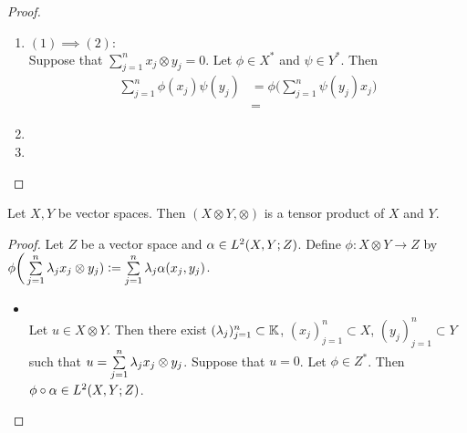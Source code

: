 \documentclass{book}
\begin{document}
 \begin{proof}\
 	\begin{enumerate}
 		\item $(1) \implies (2):$ \\
 		Suppose that $\sum\limits_{j=1}^n x_j \otimes y_j = 0$. Let $\phi \in X^*$ and $\psi \in Y^*$. Then 
 		\begin{align*}
 			\sum\limits_{j=1}^n  \phi(x_j) \psi(y_j)
 			& = \phi \bigg( \sum\limits_{j=1}^n \psi(y_j) x_j \bigg) \\
 			& = 
 		\end{align*}
 		\item 
 		\item 
 	\end{enumerate}
 \end{proof}
 
 \begin{ex}
 	Let $X, Y$ be vector spaces. Then $(X \otimes Y, \otimes)$ is a tensor product of $X$ and $Y$. 
 \end{ex}
 
 \begin{proof}
 	Let $Z$ be a vector space and $\alpha \in L^2(X, Y; Z)$. Define $\phi: X \otimes Y \rightarrow Z$ by $\phi \bigg( \sum\limits_{j=1}^n \lambda_j x_j \otimes y_j) \vcentcolon= \sum\limits_{j =1}^n \lambda_j \alpha(x_j, y_j)$.  
 	\begin{itemize}
 		\item {} \\
 		Let $u \in X \otimes Y$. Then there exist $(\lambda_j)_{j=1}^n \subset \mathbb{K}$, $(x_j)_{j=1}^n \subset X$, $(y_j)_{j=1}^n \subset Y$ such that $u = \sum\limits_{j=1}^n \lambda_j x_j \otimes y_j$. Suppose that $u = 0$. Let $\phi \in Z^*$. Then $\phi \circ \alpha \in L^2(X,Y; Z)$.  
 	\end{itemize}
 \end{proof}
 
 
 
 
 
 
 
 
 
 
 
 
 
 
 
 
 
 
 
 
 
 
 
 
 
 
 
 
 
 
 
\end{document}
